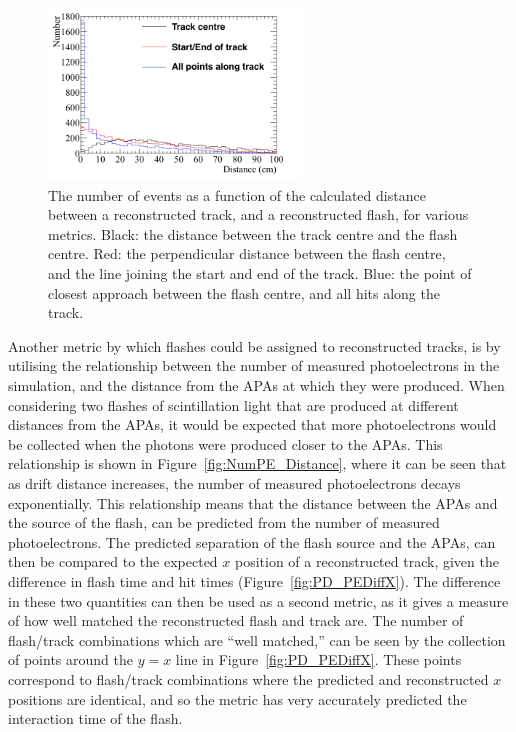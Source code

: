 \begin{figure}
  \centering
  \includegraphics[width=0.6\textwidth]{DiffTrackSeps}
  \caption[Matching tracks and flashes in the 35 ton using positions in the $yz$ plane]
          {The number of events as a function of the calculated distance between a reconstructed track, and a reconstructed flash, for various metrics. Black: the distance between the track centre and the flash centre. Red: the perpendicular distance between the flash centre, and the line joining the start and end of the track. Blue: the point of closest approach between the flash centre, and all hits along the track.}
  \label{fig:PDYZDist}
\end{figure}

Another metric by which flashes could be assigned to reconstructed tracks, is by utilising the relationship between the number of measured photoelectrons in the simulation, and the distance from the APAs at which they were produced. When considering two flashes of scintillation light that are produced at different distances from the APAs, it would be expected that more photoelectrons would be collected when the photons were produced closer to the APAs. This relationship is shown in Figure~\ref{fig:NumPE_Distance}, where it can be seen that as drift distance increases, the number of measured photoelectrons decays exponentially. This relationship means that the distance between the APAs and the source of the flash, can be predicted from the number of measured photoelectrons. The predicted separation of the flash source and the APAs, can then be compared to the expected $x$ position of a reconstructed track, given the difference in flash time and hit times (Figure~\ref{fig:PD_PEDiffX}). The difference in these two quantities can then be used as a second metric, as it gives a measure of how well matched the reconstructed flash and track are. The number of flash/track combinations which are ``well matched,'' can be seen by the collection of points around the $y=x$ line in Figure~\ref{fig:PD_PEDiffX}. These points correspond to flash/track combinations where the predicted and reconstructed $x$ positions are identical, and so the metric has very accurately predicted the interaction time of the flash. \\


